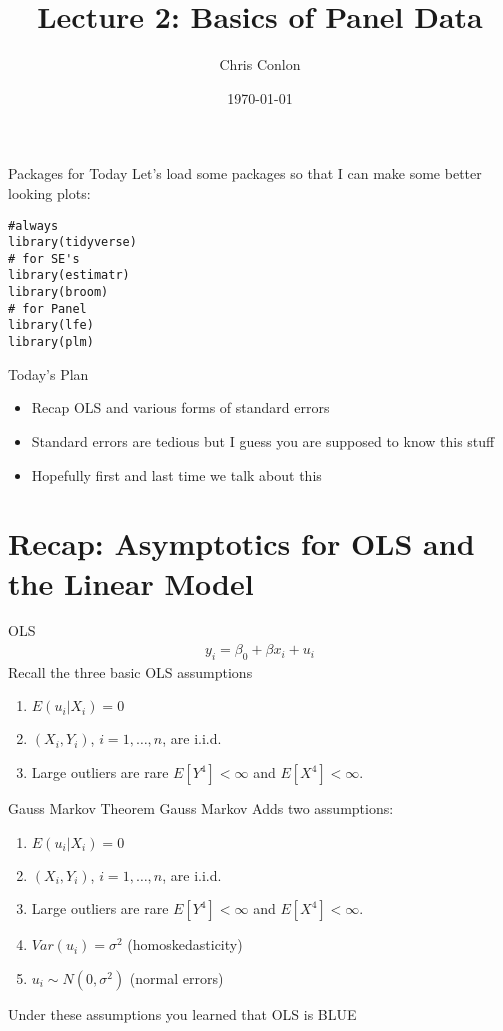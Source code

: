 \documentclass[aspectratio=169]{beamer}
\title{Lecture 2: Basics of Panel Data}
\author{Chris Conlon }
\institute{NYU Stern }
\date{\today}
\begin{document}
\maketitle

\begin{frame}[fragile]{Packages for Today}
Let's load some packages so that I can make some better looking plots:\\
\begin{verbatim}
#always
library(tidyverse)
# for SE's
library(estimatr)
library(broom)
# for Panel
library(lfe)
library(plm)
\end{verbatim}
\end{frame}


\begin{frame}{Today's Plan}
\begin{itemize}
\item Recap OLS and various forms of standard errors
\item Standard errors are tedious but I guess you are supposed to know this stuff
\item Hopefully first and last time we talk about this
\end{itemize}
\end{frame}


\section{Recap: Asymptotics for OLS and the Linear Model}


\begin{frame}{OLS}
\begin{align*}
y_i = \beta_0 + \beta x_i + u_i
\end{align*}
Recall the three basic OLS assumptions
\begin{enumerate}
\item $E(u_i |X_i ) = 0$
\item $(X_i,Y_i)$, $i =1,\ldots,n$, are i.i.d.
\item Large outliers are rare $E[Y^4]< \infty$ and $E[X^4]<\infty$.
\end{enumerate}
\end{frame}

\begin{frame}{Gauss Markov Theorem}
Gauss Markov Adds two assumptions:
\begin{enumerate}
\item $E(u_i |X_i ) = 0$
\item $(X_i,Y_i)$, $i =1,\ldots,n$, are i.i.d.
\item Large outliers are rare $E[Y^4]< \infty$ and $E[X^4]<\infty$.
\item $Var(u_i) = \sigma^2$ (homoskedasticity)
\item $u_i \sim N(0,\sigma^2)$ (normal errors)
\end{enumerate}
Under these assumptions you learned that OLS is \alert{BLUE}
\end{frame}
\end{document}
